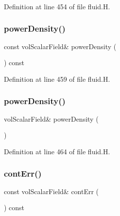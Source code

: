 Definition at line 454 of file fluid.\+H.

\mbox{\label{classFoam_1_1fluid_aff95d465650759a2c00c79eb7b070b8d}} 
\subsubsection{\texorpdfstring{power\+Density()}{powerDensity()}\hspace{0.1cm}{\footnotesize\ttfamily [1/2]}}
{\footnotesize\ttfamily const vol\+Scalar\+Field\& power\+Density (\begin{DoxyParamCaption}{ }\end{DoxyParamCaption}) const\hspace{0.3cm}{\ttfamily [inline]}}



Definition at line 459 of file fluid.\+H.

\mbox{\label{classFoam_1_1fluid_acf9586cfd5a2533c0fc8c454f2066083}} 
\subsubsection{\texorpdfstring{power\+Density()}{powerDensity()}\hspace{0.1cm}{\footnotesize\ttfamily [2/2]}}
{\footnotesize\ttfamily vol\+Scalar\+Field\& power\+Density (\begin{DoxyParamCaption}{ }\end{DoxyParamCaption})\hspace{0.3cm}{\ttfamily [inline]}}



Definition at line 464 of file fluid.\+H.

\mbox{\label{classFoam_1_1fluid_a5b0ea2c16d85ba1d495515665fd0d59a}} 
\subsubsection{\texorpdfstring{cont\+Err()}{contErr()}\hspace{0.1cm}{\footnotesize\ttfamily [1/2]}}
{\footnotesize\ttfamily const vol\+Scalar\+Field\& cont\+Err (\begin{DoxyParamCaption}{ }\end{DoxyParamCaption}) const\hspace{0.3cm}{\ttfamily [inline]}}



